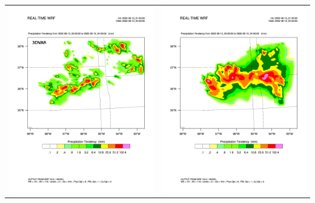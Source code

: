 \documentclass{beamer}
\begin{document}
{\begin{tabular}{l r}
\includegraphics[scale=0.20, trim=1 160 3 130, clip]{radar_3dvar} & \includegraphics[scale=0.20, trim=1 160 3 130, clip]{radar_4dvar}
\end{tabular}
}
\end{document}
